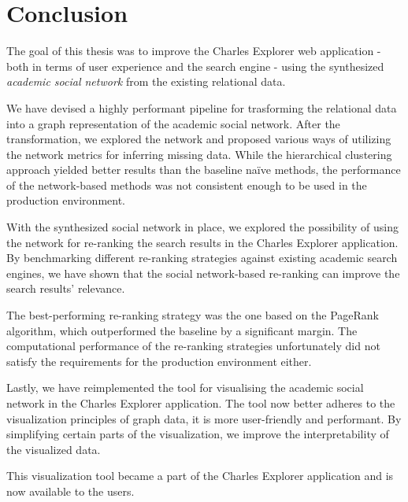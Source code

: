 \chapter*{Conclusion}

The goal of this thesis was to improve the Charles Explorer web application - both in terms of user experience and the search engine - using the synthesized \textit{academic social network} from the existing relational data.

We have devised a highly performant pipeline for trasforming the relational data into a graph representation of the academic social network.
After the transformation, we explored the network and proposed various ways of utilizing the network metrics for inferring missing data.
While the hierarchical clustering approach yielded better results than the baseline naïve methods, the performance of the network-based methods was not consistent enough to be used in the production environment.

With the synthesized social network in place, we explored the possibility of using the network for re-ranking the search results in the Charles Explorer application.
By benchmarking different re-ranking strategies against existing academic search engines, we have shown that the social network-based re-ranking can improve the search results' relevance.

The best-performing re-ranking strategy was the one based on the PageRank algorithm, which outperformed the baseline by a significant margin.
The computational performance of the re-ranking strategies unfortunately did not satisfy the requirements for the production environment either.

Lastly, we have reimplemented the tool for visualising the academic social network in the Charles Explorer application. 
The tool now better adheres to the visualization principles of graph data, it is more user-friendly and performant.
By simplifying certain parts of the visualization, we improve the interpretability of the visualized data.

This visualization tool became a part of the Charles Explorer application and is now available to the users.

